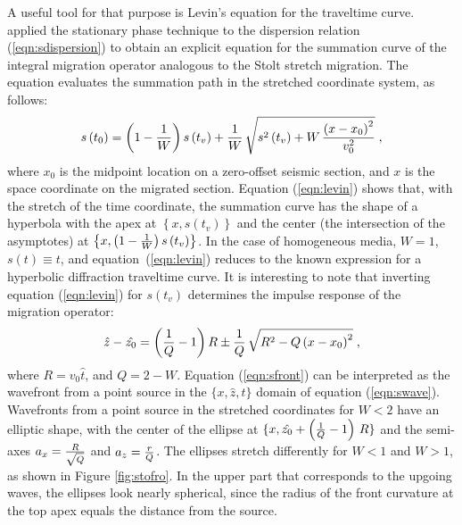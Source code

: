 A useful tool for that purpose is Levin's equation for the traveltime
curve.   applied the stationary
phase technique to the dispersion relation (\ref{eqn:sdispersion}) to
obtain an explicit equation for the summation curve of the integral
migration operator analogous to the Stolt stretch migration. The
equation evaluates the summation path in the stretched coordinate
system, as follows:
\begin{equation}
s\left(t_0\right)=
\left(1-{1\over W}\right) s\left(t_v\right)+
{1\over W}\,
\sqrt{s^2\left(t_v\right) + {W\,
 {{\left(x-x_0\right)^2} \over v_0^2}}}\;,
\label{eqn:levin} 
\end{equation}
where $x_0$ is the midpoint location on a zero-offset seismic section,
and $x$ is the space coordinate on the migrated section.  Equation
(\ref{eqn:levin}) shows that, with the stretch of the time coordinate,
the summation curve has the shape of a hyperbola with the apex at
$\left\{x,s\left(t_v\right)\right\}$ and the center (the intersection
of the asymptotes) at $\left\{x,{\left(1-{1\over
        W}\right)}\,s\left(t_v\right)\right\}$. In the case of
homogeneous media, $W=1$, $s(t)\equiv t$, and
equation~(\ref{eqn:levin}) reduces to the known expression for a
hyperbolic diffraction traveltime curve. It is interesting to note
that inverting equation (\ref{eqn:levin}) for $s\left(t_v\right)$
determines the impulse response of the migration operator:
\begin{equation}
\hat{z}-\hat{z_0}=
\left({1\over Q}-1\right) R \pm
{1\over Q}\,
\sqrt{R^2 - 
{Q\,{\left(x-x_0\right)^2}}}\;,
\label{eqn:sfront} 
\end{equation}
where $R=v_0 \hat{t}$, and $Q=2-W$. Equation (\ref{eqn:sfront}) can be
interpreted as the wavefront from a point source in the
$\{x,\hat{z},\hat{t}\}$ domain of equation (\ref{eqn:swave}).
Wavefronts from a point source in the stretched coordinates for $W<2$
have an elliptic shape, with the center of the ellipse at
$\{x,\hat{z_0}+\left( {1 \over Q}-1\right)\, R \}$ and the semi-axes
$a_x={R \over \sqrt{Q}}$ and $a_z={r \over Q}$. The ellipses stretch
differently for $W<1$ and $W>1$, as shown in Figure \ref{fig:stofro}.
In the upper part that corresponds to the upgoing waves, the ellipses
look nearly spherical, since the radius of the front curvature at the
top apex equals the distance from the source.


